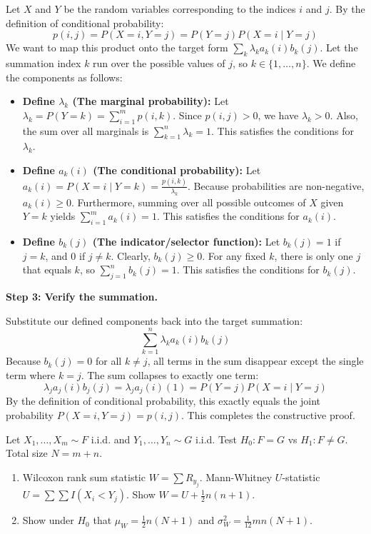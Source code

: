 \begin{solution}
Let $X$ and $Y$ be the random variables corresponding to the indices $i$ and $j$. By the definition of conditional probability:
\[ p(i, j) = P(X=i, Y=j) = P(Y=j) P(X=i \mid Y=j) \]
We want to map this product onto the target form $\sum_k \lambda_k a_k(i) b_k(j)$.
Let the summation index $k$ run over the possible values of $j$, so $k \in \{1, \dots, n\}$.
We define the components as follows:
\begin{itemize}
    \item \textbf{Define $\lambda_k$ (The marginal probability):} Let $\lambda_k = P(Y=k) = \sum_{i=1}^m p(i, k)$. Since $p(i, j) > 0$, we have $\lambda_k > 0$. Also, the sum over all marginals is $\sum_{k=1}^n \lambda_k = 1$. This satisfies the conditions for $\lambda_k$.
    \item \textbf{Define $a_k(i)$ (The conditional probability):} Let $a_k(i) = P(X=i \mid Y=k) = \frac{p(i, k)}{\lambda_k}$. Because probabilities are non-negative, $a_k(i) \geq 0$. Furthermore, summing over all possible outcomes of $X$ given $Y=k$ yields $\sum_{i=1}^m a_k(i) = 1$. This satisfies the conditions for $a_k(i)$.
    \item \textbf{Define $b_k(j)$ (The indicator/selector function):} Let $b_k(j) = 1$ if $j = k$, and $0$ if $j \neq k$. Clearly, $b_k(j) \geq 0$. For any fixed $k$, there is only one $j$ that equals $k$, so $\sum_{j=1}^n b_k(j) = 1$. This satisfies the conditions for $b_k(j)$.
\end{itemize}

\textbf{Step 3: Verify the summation.}

Substitute our defined components back into the target summation:
\[ \sum_{k=1}^n \lambda_k a_k(i) b_k(j) \]
Because $b_k(j) = 0$ for all $k \neq j$, all terms in the sum disappear except the single term where $k = j$.
The sum collapses to exactly one term:
\[ \lambda_j a_j(i) b_j(j) = \lambda_j a_j(i) (1) = P(Y=j) P(X=i \mid Y=j) \]
By the definition of conditional probability, this exactly equals the joint probability $P(X=i, Y=j) = p(i, j)$.
This completes the constructive proof.
\end{solution}

\begin{exercise}\label{probability:2012:4}
Let $X_1, \dots, X_m \sim F$ i.i.d. and $Y_1, \dots, Y_n \sim G$ i.i.d. Test $H_0: F=G$ vs $H_1: F \neq G$. Total size $N = m+n$.
\begin{enumerate}
    \item Wilcoxon rank sum statistic $W = \sum R_{y_j}$. Mann-Whitney $U$-statistic $U = \sum \sum I(X_i < Y_j)$. Show $W = U + \frac{1}{2}n(n+1)$.
    \item Show under $H_0$ that $\mu_W = \frac{1}{2}n(N+1)$ and $\sigma_W^2 = \frac{1}{12}mn(N+1)$.
\end{enumerate}
\end{exercise}

